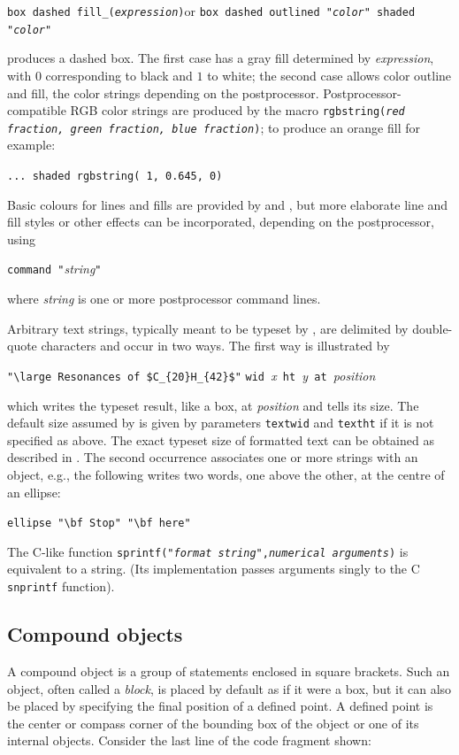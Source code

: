 {\tt box dashed fill\_({\sl expression})}\quad or\quad
 {\tt box dashed outlined "{\sl color}" shaded "{\sl color}"}

\noindent
produces a dashed box. The first case has a gray fill determined by
{\sl expression}, with $0$ corresponding to black and $1$ to white;
the second case allows color outline and fill, the color strings depending on
the postprocessor.
Postprocessor-compatible RGB color strings are produced by the macro
{\tt rgbstring({\sl red fraction, green fraction, blue fraction})};
to produce an orange fill for example:

{\tt ... shaded rgbstring( 1, 0.645, 0)}

Basic colours for lines and fills are provided by \gpic  and \dpic,
but more elaborate line and fill styles or other effects
can be incorporated, depending on the postprocessor, using

{\tt command "}{\sl string}{\tt "}

\noindent where {\sl string} is one or more postprocessor command lines.

Arbitrary text strings, typically meant to be typeset by \latex, are
delimited by double-quote characters and occur in two ways.  The first
way is illustrated by

\verb|"\large Resonances of $C_{20}H_{42}$"|
 \verb|wid |{\sl x}\verb| ht |{\sl y}\verb| at |{\sl position}

\noindent
which writes the typeset result, like a box, at {\sl position} and tells
\pic its size.  The default size assumed by \pic is given by parameters
{\tt textwid} and {\tt textht} if it is not specified as above.
The exact typeset size of formatted text can be obtained
as described in .  The second occurrence
associates one or more strings with an object, e.g., the following writes
two words, one above the other, at the centre of an ellipse:

\verb|ellipse "\bf Stop" "\bf here"|

\noindent
The C-like \pic function
 {\tt sprintf("{\sl format string}",{\sl numerical arguments})}
is equivalent to a string.
(Its implementation passes arguments singly to the C {\tt snprintf}
function).

\subsection{Compound objects\label{Compoundobjects:}}
A compound object is a group of statements enclosed in square
brackets.  Such an object, often called a {\em block},
is placed by default as if it were a box, but
it can also be placed by specifying the final position of a defined point.
A defined point is the center or compass corner of the bounding box
of the object or one of its internal objects.
Consider the last line of the code fragment shown:

